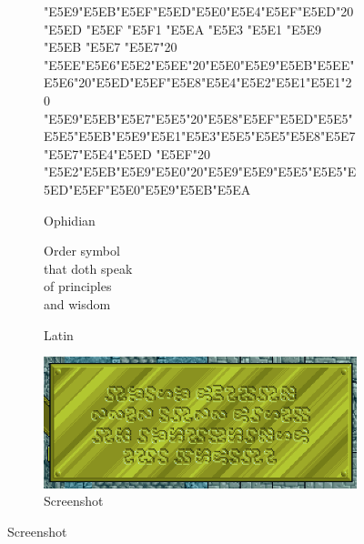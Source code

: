 \documentclass[letterpaper]{article}
\newcommand{\sampletext}[1]{{\samplefont\Large#1}}
\begin{document}
\begin{figure}
  \begin{subfigure}{0.32\textwidth}
    \centering
    \caption{Ophidian}
    \sampletext{
      \char"E5E9\char"E5EB\char"E5EF\char"E5ED\char"E5E0\char"E5E4\char"E5EF\char"E5ED\char"20 \char"E5ED \char"E5EF \char"E5F1 \char"E5EA \char"E5E3 \char"E5E1 \char"E5E9 \char"E5EB \char"E5E7 \char"E5E7\char"20\\
      \char"E5EE\char"E5E6\char"E5E2\char"E5EE\char"20\char"E5E0\char"E5E9\char"E5EB\char"E5EE\char"E5E6\char"20\char"E5ED\char"E5EF\char"E5E8\char"E5E4\char"E5E2\char"E5E1\char"E5E1\char"20\\
      \char"E5E9\char"E5EB\char"E5E7\char"E5E5\char"20\char"E5E8\char"E5EF\char"E5ED\char"E5E5\char"E5E5\char"E5EB\char"E5E9\char"E5E1\char"E5E3\char"E5E5\char"E5E5\char"E5E8\char"E5E7\char"E5E7\char"E5E4\char"E5ED \char"E5EF\char"20\\
      \char"E5E2\char"E5EB\char"E5E9\char"E5E0\char"20\char"E5E9\char"E5E9\char"E5E5\char"E5E5\char"E5ED\char"E5EF\char"E5E0\char"E5E9\char"E5EB\char"E5EA\\
    }
  \end{subfigure}
  \begin{subfigure}{0.32\textwidth}
    \centering
    \caption{Latin}
    \sampletext{
      Order symbol\\
      that doth speak\\
      of principles\\
      and wisdom\\
    }
  \end{subfigure}
  \begin{subfigure}{0.32\textwidth}
    \centering
    \caption{Screenshot}

    \includegraphics[scale=0.25]{ophidian-sign}
  \end{subfigure}
  
\end{figure}
\end{document}
